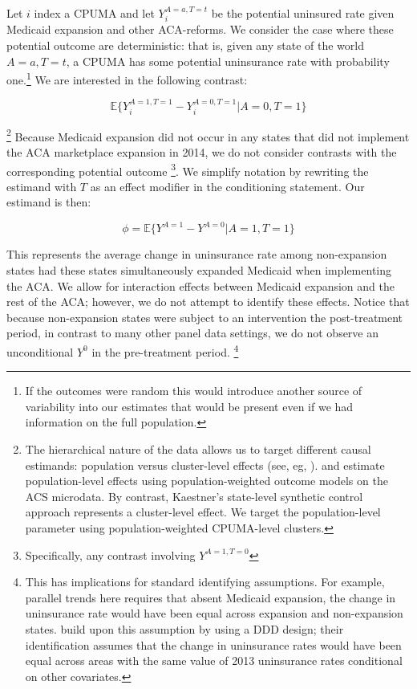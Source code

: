 \documentclass[final]{article}
\begin{document}
Let $i$ index a CPUMA and let $Y_i^{A = a, T = t}$ be the potential uninsured rate given Medicaid expansion and other ACA-reforms. We consider the case where these potential outcome are deterministic: that is, given any state of the world $A = a, T = t$, a CPUMA has some potential uninsurance rate with probability one.\footnote{If the outcomes were random this would introduce another source of variability into our estimates that would be present even if we had information on the full population.} We are interested in the following contrast:

$$
\mathbb{E}\{Y_i^{A = 1, T = 1} - Y_i^{A = 0, T = 1} | A = 0, T = 1\}
$$

\footnote{The hierarchical nature of the data allows us to target different causal estimands: population versus cluster-level effects (see, eg, \cite{athey2017econometrics}). \cite{courtemanche2017early} and \cite{frean2017premium} estimate population-level effects using population-weighted outcome models on the ACS microdata. By contrast, Kaestner's state-level synthetic control approach represents a cluster-level effect. We target the population-level parameter using population-weighted CPUMA-level clusters.} Because Medicaid expansion did not occur in any states that did not implement the ACA marketplace expansion in 2014, we do not consider contrasts with the corresponding potential outcome \footnote{Specifically, any contrast involving $Y^{A = 1, T = 0}$}. We simplify notation by rewriting the estimand with $T$ as an effect modifier in the conditioning statement. Our estimand is then:

$$
\phi = \mathbb{E}\{Y^{A = 1} - Y^{A = 0} | A = 1, T = 1\}
$$

This represents the average change in uninsurance rate among non-expansion states had these states simultaneously expanded Medicaid when implementing the ACA. We allow for interaction effects between Medicaid expansion and the rest of the ACA; however, we do not attempt to identify these effects. Notice that because non-expansion states were subject to an intervention the post-treatment period, in contrast to many other panel data settings, we do not observe an unconditional $Y^0$ in the pre-treatment period. \footnote{This has implications for standard identifying assumptions. For example, parallel trends here requires that absent Medicaid expansion, the change in uninsurance rate would have been equal across expansion and non-expansion states. \cite{courtemanche2017early} build upon this assumption by using a DDD design; their identification assumes that the change in uninsurance rates would have been equal across areas with the same value of 2013 uninsurance rates conditional on other covariates.}
\end{document}
